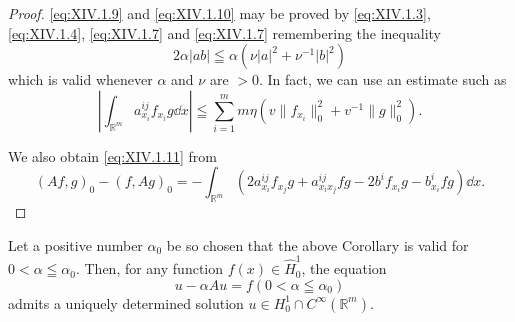 \begin{proof}
 \eqref{eq:XIV.1.9} and \eqref{eq:XIV.1.10} may be proved by \eqref{eq:XIV.1.3}, \eqref{eq:XIV.1.4}, \eqref{eq:XIV.1.7} and \eqref{eq:XIV.1.7} remembering the inequality 
\begin{equation}\label{eq:XIV.1.12}
2 \alpha | a b | \leqq \alpha (\nu | a | ^{2} + \nu^{-1} | b | ^{2})
\end{equation}
which is valid whenever $\alpha$ and $\nu$ are $>0$. In fact, we can use an estimate such as 
\[
\left| \int_ {\mathbb{R}^{m}} a _ {x _{i}} ^{ij} f _ {x _{i}} g \dd x \right| \leqq \sum\limits_{i=1} ^{m} m \eta (v \| f _ {x _{i}} \| _{0} ^{2} + v ^{-1} \| g \| _{0} ^{2}). \]

We also obtain \eqref{eq:XIV.1.11} from 
\[
(A f, g) _{0} - (f, A g) _{0} = - \int_ {\mathbb{R}^{m}} \left(2 a _ {x _{i}} ^{ij} f _ {x _{j}} g + a _ {x _{i} x _{j}} ^{ij} f g - 2 b ^{i} f _ {x _{i}} g - b _ {x _{i}} ^{i} f g\right) \dd x.
\]
\end{proof}

\begin{lemma}[concerning the existence of solutions of $u - \alpha A u = f$]\label{lem:XIV.1.Lemma.2} Let a positive number $\alpha_0$ be so chosen that the above Corollary is valid for $0 < \alpha \leqq \alpha_0$. Then, for any function $f(x) \in \hat{H}_0^1$, the equation 
\begin{equation}\label{eq:XIV.1.13}
u - \alpha A u = f (0 < \alpha \leqq \alpha_{0})
\end{equation}
admits a uniquely determined solution $u \in H_{0}^{1} \cap C^{\infty}(\mathbb{R}^{m})$. 
\end{lemma}

